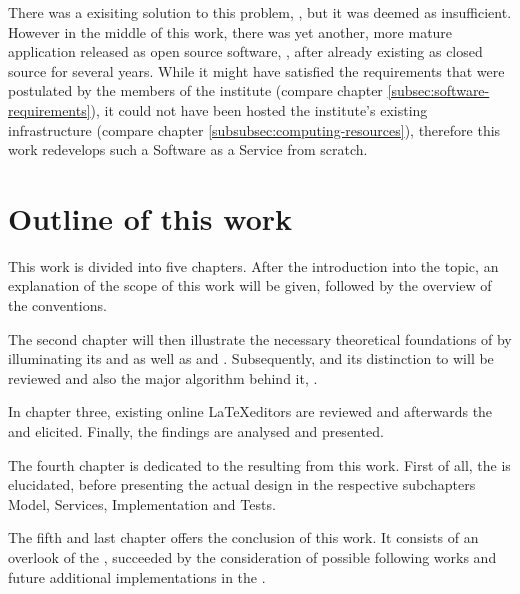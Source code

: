 There was a exisiting solution to this problem, , but it was deemed as insufficient. However in the middle of this work, there was yet another, more mature application released as open source software, , after already existing as closed source for several years. While it might have satisfied the requirements that were postulated by the members of the institute (compare chapter \ref{subsec:software-requirements}), it could not have been hosted the institute's existing infrastructure (compare chapter \ref{subsubsec:computing-resources}), therefore this work redevelops such a Software as a Service from scratch.

\section{Outline of this work}

This work is divided into five chapters. After the introduction into the topic, an explanation of the scope of this work will be given, followed by the overview of the conventions.

The second chapter will then illustrate the necessary theoretical foundations of  by illuminating its  and  as well as  and . Subsequently,  and its distinction to  will be reviewed and also the major algorithm behind it, .

\pagebreak

In chapter three, existing online \LaTeX editors are reviewed and afterwards the  and  elicited. Finally, the findings are analysed and presented.

The fourth chapter is dedicated to the  resulting from this work. First of all, the  is elucidated, before presenting the actual design in the respective subchapters Model, Services, Implementation and Tests.

The fifth and last chapter offers the conclusion of this work. It consists of an overlook of the , succeeded by the consideration of possible following works and future additional implementations in the .

